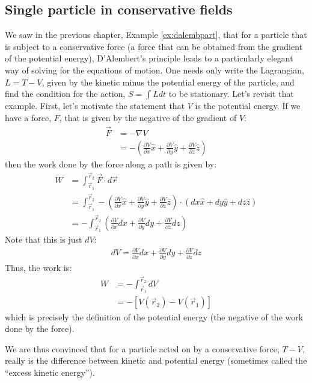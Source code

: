 \subsection{Single particle in conservative fields}
We saw in the previous chapter, Example \ref{ex:dalembpart}, that for a particle that is subject to a conservative force (a force that can be obtained from the gradient of the potential energy), D'Alembert's principle leads to a particularly elegant way of solving for the equations of motion. One needs only write the Lagrangian, $L=T-V$, given by the kinetic minus the potential energy of the particle, and find the condition for the action, $S=\int Ldt$ to be stationary. Let's revisit that example. First, let's motivate the statement that $V$ is the potential energy. If we have a force, $F$, that is given by the negative of the gradient of $V$:
\begin{align}
\vec{F}&=-\nabla V\nonumber\\
&=-\left(\frac{\partial V}{\partial x} \hat{x} + \frac{\partial V}{\partial y} \hat{y}+\frac{\partial V}{\partial z} \hat{z} \right)
\end{align}
then the work done by the force along a path is given by:
\begin{align}
W&=\int_{\vec{r}_1}^{\vec{r}_2} \vec{F}\cdot d\vec{r}\nonumber\\
&=\int_{\vec{r}_1}^{\vec{r}_2} -\left(\frac{\partial V}{\partial x} \hat{x} + \frac{\partial V}{\partial y} \hat{y}+\frac{\partial V}{\partial z} \hat{z} \right) \cdot (dx \hat{x}+dy \hat{y} +dz \hat{z} )\nonumber\\
&=-\int_{\vec{r}_1}^{\vec{r}_2} \left(\frac{\partial V}{\partial x} dx + \frac{\partial V}{\partial y} dy +\frac{\partial V}{\partial z} dz\right)
\end{align}
Note that this is just $dV$:
\begin{align}
dV=\frac{\partial V}{\partial x} dx + \frac{\partial V}{\partial y} dy +\frac{\partial V}{\partial z} dz
\end{align}
Thus, the work is:
\begin{align}
W&=-\int_{\vec{r}_1}^{\vec{r}_2}dV\nonumber\\
&=-\left [ V(\vec{r}_2)-V(\vec{r}_1)\right ]
\end{align}
which is precisely the definition of the potential energy (the negative of the work done by the force).

We are thus convinced that for a particle acted on by a conservative force, $T-V$, really is the difference between kinetic and potential energy (sometimes called the ``excess kinetic energy'').

